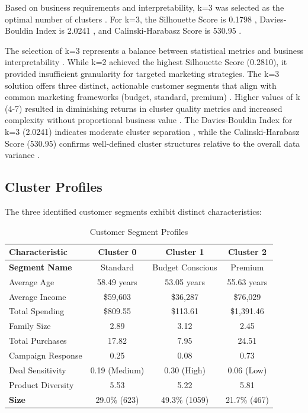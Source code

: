 \documentclass[12pt,a4paper]{report}
\begin{document}
\noindent Based on business requirements and interpretability, k=3 was selected as the optimal number of clusters \cite{wedel2000market}. For k=3, the Silhouette Score is 0.1798 \cite{rousseeuw1987}, Davies-Bouldin Index is 2.0241 \cite{davies1979}, and Calinski-Harabasz Score is 530.95 \cite{calinski1974}.

\noindent The selection of k=3 represents a balance between statistical metrics and business interpretability \cite{kotler2016}. While k=2 achieved the highest Silhouette Score (0.2810), it provided insufficient granularity for targeted marketing strategies. The k=3 solution offers three distinct, actionable customer segments that align with common marketing frameworks (budget, standard, premium) \cite{wedel2000}. Higher values of k (4-7) resulted in diminishing returns in cluster quality metrics and increased complexity without proportional business value \cite{monti2003}. The Davies-Bouldin Index for k=3 (2.0241) indicates moderate cluster separation \cite{davies1979}, while the Calinski-Harabasz Score (530.95) confirms well-defined cluster structures relative to the overall data variance \cite{calinski1974}.


\subsection{Cluster Profiles}
\noindent The three identified customer segments exhibit distinct characteristics:

\begin{table}[htbp]
\caption{Customer Segment Profiles}
\label{tab:segment_profiles}
\centering
\small
\begin{tabular}{|l|c|c|c|}
\hline
\textbf{Characteristic} & \textbf{Cluster 0} & \textbf{Cluster 1} & \textbf{Cluster 2} \\
\hline
\textbf{Segment Name} & Standard & Budget Conscious & Premium \\
\hline
Average Age & 58.49 years & 53.05 years & 55.63 years \\
\hline
Average Income & \$59,603 & \$36,287 & \$76,029 \\
\hline
Total Spending & \$809.55 & \$113.61 & \$1,391.46 \\
\hline
Family Size & 2.89 & 3.12 & 2.45 \\
\hline
Total Purchases & 17.82 & 7.95 & 24.51 \\
\hline
Campaign Response & 0.25 & 0.08 & 0.73 \\
\hline
Deal Sensitivity & 0.19 (Medium) & 0.30 (High) & 0.06 (Low) \\
\hline
Product Diversity & 5.53 & 5.22 & 5.81 \\
\hline
\textbf{Size} & 29.0\% (623) & 49.3\% (1059) & 21.7\% (467) \\
\hline
\end{tabular}
\end{table}
\end{document}
